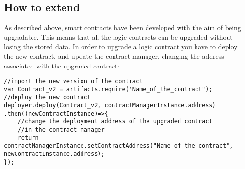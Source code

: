 \subsection{How to extend}
As described above, smart contracts have been developed with the aim of being upgradable. This means that all the logic contracts can be upgraded without losing the stored data. In order to upgrade a logic contract you have to deploy the new contract, and update the contract manager, changing the address associated with the upgraded contract:
\begin{lstlisting}
//import the new version of the contract
var Contract_v2 = artifacts.require("Name_of_the_contract");
//deploy the new contract
deployer.deploy(Contract_v2, contractManagerInstance.address)
.then((newContractInstance)=>{
	//change the deployment address of the upgraded contract
	//in the contract manager
	return contractManagerInstance.setContractAddress("Name_of_the_contract", newContractInstance.address);
});
\end{lstlisting}


